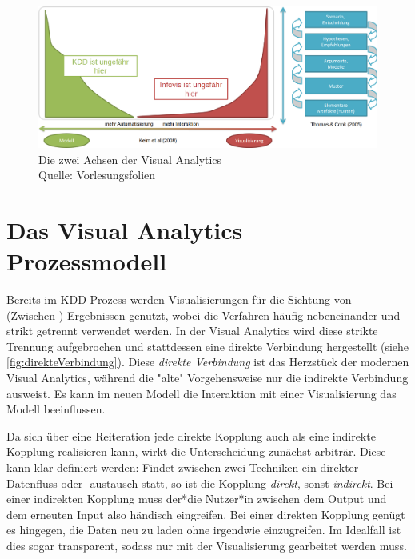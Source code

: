 			\begin{figure}
				\centering
				\includegraphics[width=\linewidth]{va}
				\caption[Die zwei Achsen der Visual Analytics]{Die zwei Achsen der Visual Analytics\\Quelle: Vorlesungsfolien}
				\label{fig:va}
			\end{figure}

	\section{Das Visual Analytics Prozessmodell}
		Bereits im KDD-Prozess werden Visualisierungen für die Sichtung von (Zwischen-) Ergebnissen genutzt, wobei die Verfahren häufig nebeneinander und strikt getrennt verwendet werden. In der Visual Analytics wird diese strikte Trennung aufgebrochen und stattdessen eine direkte Verbindung hergestellt (siehe \autoref{fig:direkteVerbindung}). Diese \emph{direkte Verbindung} ist das Herzstück der modernen Visual Analytics, während die "alte" Vorgehensweise nur die indirekte Verbindung ausweist. Es kann im neuen Modell \zB die Interaktion mit einer Visualisierung das Modell beeinflussen.

		Da sich über eine Reiteration jede direkte Kopplung auch als eine indirekte Kopplung realisieren kann, wirkt die Unterscheidung zunächst arbiträr. Diese kann klar definiert werden: Findet zwischen zwei Techniken ein direkter Datenfluss oder -austausch statt, so ist die Kopplung \emph{direkt}, sonst \emph{indirekt}. Bei einer indirekten Kopplung muss der*die Nutzer*in zwischen dem Output und dem erneuten Input also händisch eingreifen. Bei einer direkten Kopplung genügt es hingegen, die Daten neu zu laden ohne irgendwie einzugreifen. Im Idealfall ist dies sogar transparent, sodass nur mit der Visualisierung gearbeitet werden muss.

